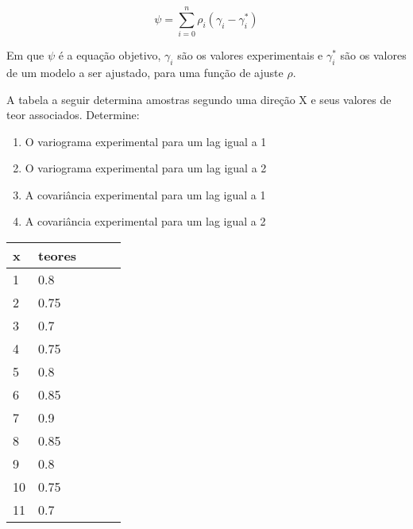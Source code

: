 \begin{equation}\label{Equacao18}
\psi = \sum_{i=0}^{n}\rho_i(\gamma_i - \gamma_i^*)
\end{equation}

Em que $\psi$ é a equação objetivo, $\gamma_i$ são os valores experimentais e  $\gamma_i^*$ são os valores de um modelo a ser ajustado, para uma função de ajuste $\rho$.

\begin{exercise}
	A tabela a seguir determina amostras segundo uma direção X e seus valores de teor associados. Determine:\\
	
	\begin{enumerate}
	 \item O variograma experimental para um lag igual a 1\\
	 \item O variograma experimental para um lag igual a 2\\
	 \item A covariância experimental para um lag igual a 1\\
	 \item A covariância experimental para um lag igual a 2\\ 
	\end{enumerate}
	
	\begin{tabular}{lllll}
		\hline
		x  & teores &  &  &  \\ \hline
		1  & 0.8    &  &  &  \\
		2  & 0.75   &  &  &  \\
		3  & 0.7    &  &  &  \\
		4  & 0.75   &  &  &  \\
		5  & 0.8    &  &  &  \\
		6  & 0.85   &  &  &  \\
		7  & 0.9    &  &  &  \\
		8  & 0.85   &  &  &  \\
		9  & 0.8    &  &  &  \\
		10 & 0.75   &  &  &  \\
		11 & 0.7    &  &  &  \\ \hline
	\end{tabular}
	
\end{exercise}
